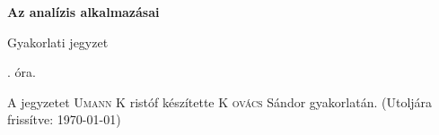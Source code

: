 \documentclass[a4paper,11.5pt]{article}
\begin{document}
	\setlength\parindent{0pt}
	\def\a{\textbf{a}}
	\def\b{\textbf{b}}
	\def\N{\hskip 10 true mm}
	\def\a{\textbf{a}}
	\def\b{\textbf{b}}
	\def\c{\textbf{c}}
	\def\d{\textbf{d}}
	\def\e{\textbf{e}}
	\def\gg{$\gamma$}
	\def\vi{\textbf{i}}
	\def\jj{\textbf{j}}
	\def\kk{\textbf{k}}
	\def\fh{\overrightarrow}
	\def\l{\lambda}
	\def\m{\mu}
	\def\v{\textbf{v}}
	\def\0{\textbf{0}}
	\def\s{\hspace{0.2mm}\vphantom{\beta}}
	\def\Z{\mathbb{Z}}
	\def\Q{\mathbb{Q}}
	\def\R{\mathbb{R}}
	\def\C{\mathbb{C}}
	\def\N{\mathbb{N}}
	\def\Rn{\mathbb{R}^{n}}
	\def\Ra{\overline{\mathbb{R}}}
	\def\sume{\displaystyle\sum_{n=1}^{+\infty}}
	\def\sumn{\displaystyle\sum_{n=0}^{+\infty}}
	\def\biz{\emph{Bizonyítás:\ }}
	\def\narrow{\underset{n\rightarrow+\infty}{\longrightarrow}}
	\def\limn{\displaystyle\lim_{n\to +\infty}}
	
	\theoremstyle{definition}
	\newtheorem{theorem}{Tétel}[subsubsection]
	
	\theoremstyle{definition}
	\newtheorem{definition}[theorem]{Definíció}
	\newtheorem{example}[theorem]{Példa}
	\newtheorem{exercise}[theorem]{Házi feladat}
	\newtheorem{note}[theorem]{Megjegyzés}
	\newtheorem{task}[theorem]{Feladat}
	\newtheorem{revision}[theorem]{Emlékeztető}
	\begin{center}
		{\LARGE\textbf{Az analízis alkalmazásai}}
		\smallskip

		{\Large Gyakorlati jegyzet}

		. óra.
	\end{center}
	A jegyzetet \textsc{Umann}  K ristóf készítette \textsc{ K ovács} Sándor gyakorlatán. (Utoljára frissítve: \today)
	
\end{document}
